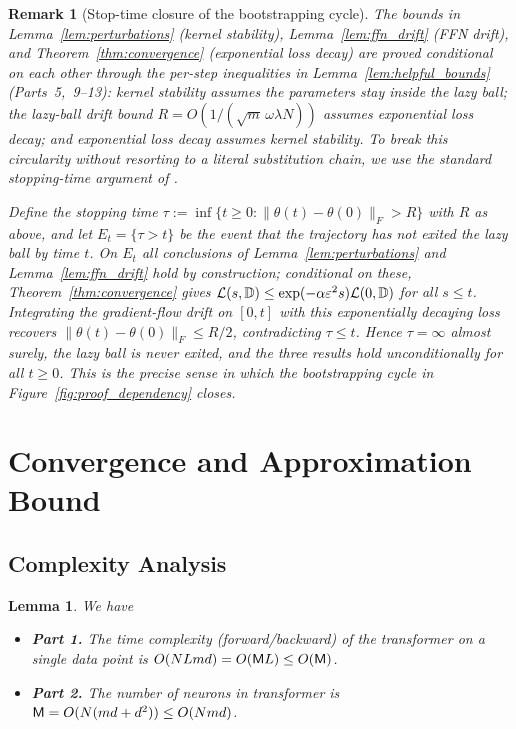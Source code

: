 \documentclass[11pt]{article}
\let\citet\citep
\theoremstyle{plain}
\newtheorem{lemma}[theorem]{Lemma}
\newtheorem{remark}[theorem]{Remark}
\begin{document}
\begin{remark}[Stop-time closure of the bootstrapping cycle]\label{rem:stop_time}
    The bounds in Lemma~\ref{lem:perturbations} (kernel stability), Lemma~\ref{lem:ffn_drift} (FFN drift), and Theorem~\ref{thm:convergence} (exponential loss decay) are proved {\it conditional} on each other through the per-step inequalities in Lemma~\ref{lem:helpful_bounds} (Parts~5,~9--13): kernel stability assumes the parameters stay inside the lazy ball; the lazy-ball drift bound $R=O(1/(\sqrt m\,\omega\lambda N))$ assumes exponential loss decay; and exponential loss decay assumes kernel stability. To break this circularity without resorting to a literal substitution chain, we use the standard stopping-time argument of \citet[Section 3]{dzps19}.

    Define the stopping time $\tau := \inf\{t \ge 0 : \|\theta(t)-\theta(0)\|_F > R\}$ with $R$ as above, and let $E_t = \{\tau > t\}$ be the event that the trajectory has not exited the lazy ball by time $t$. On $E_t$ all conclusions of Lemma~\ref{lem:perturbations} and Lemma~\ref{lem:ffn_drift} hold by construction; conditional on these, Theorem~\ref{thm:convergence} gives ${\cal L}(s, \mathbb{D}) \le \exp(-\alpha\varepsilon^2 s){\cal L}(0,\mathbb{D})$ for all $s\le t$. Integrating the gradient-flow drift on $[0,t]$ with this exponentially decaying loss recovers $\|\theta(t)-\theta(0)\|_F \le R/2$, contradicting $\tau \le t$. Hence $\tau = \infty$ almost surely, the lazy ball is never exited, and the three results hold {\it unconditionally} for all $t\ge 0$. This is the precise sense in which the bootstrapping cycle in Figure~\ref{fig:proof_dependency} closes.
\end{remark}

\newpage%
% 
\section{Convergence and Approximation Bound}\label{app:proof_convergence}


\subsection{Complexity Analysis}

\begin{lemma}\label{lem:compute_analysis}
    We have
    \begin{itemize}
        \item {\bf Part 1.} The time complexity (forward/backward) of the transformer on a single data point is $O(NLmd) = O({\sf M}L) \leq O({\sf M})$.
        \item {\bf Part 2.} The number of neurons in transformer is ${\sf M} = O(N(md+d^2)) \leq O(Nmd)$.
    \end{itemize}
\end{lemma}
\end{document}
